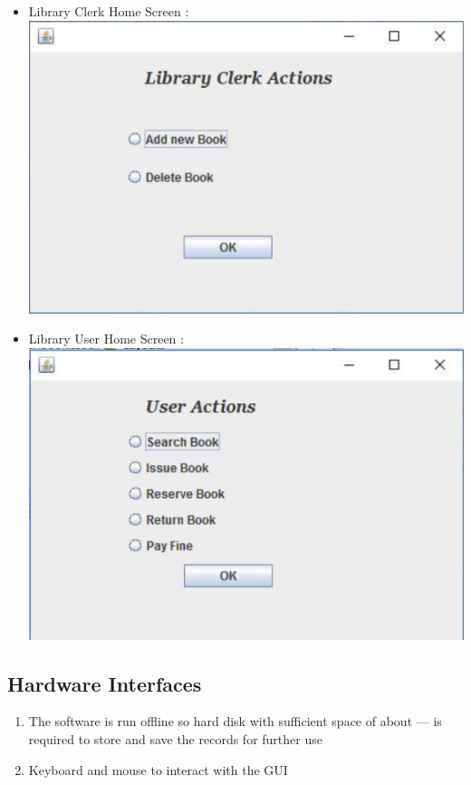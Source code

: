 \documentclass{article}
\begin{document}
\begin{itemize}
\item Library Clerk Home Screen : \\
\includegraphics[scale=0.5]{images/clerk.png}
\item Library User Home Screen : \\
\includegraphics[scale=0.5]{images/user.png}
\end{itemize}

\subsection{Hardware Interfaces}
\begin{enumerate}
\item The software is run offline so hard disk with sufficient space of about --- is required to store and save the records for further use
\item Keyboard and mouse to interact with the GUI
\end{enumerate}
\end{document}
